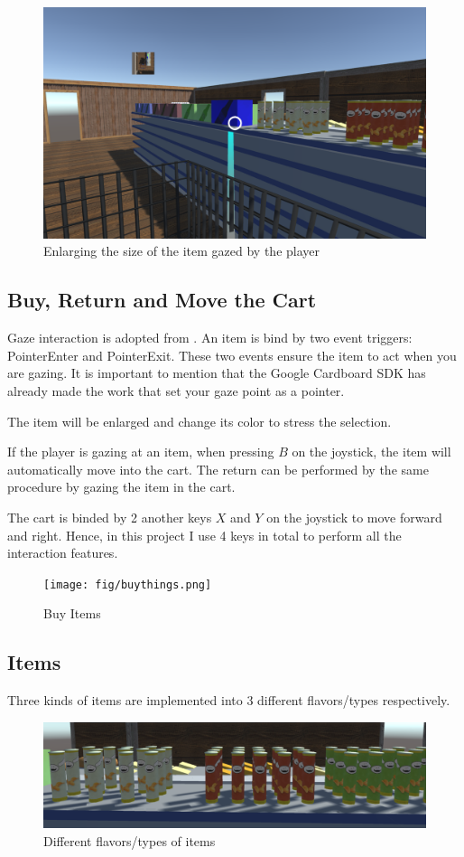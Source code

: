 \documentclass[11pt]{article}
\begin{document}
	\begin{figure}[htbp]
		\centering
		\includegraphics[width=.90\textwidth]{fig/enlargepath.png}
		\caption{Enlarging the size of the item gazed by the player}
	\end{figure}
	
	\subsection{Buy, Return and Move the Cart}
	Gaze interaction is adopted from \cite{gazeinteractiontutorial}. An item is bind by two event triggers: PointerEnter and PointerExit. These two events ensure the item to act when you are gazing. It is important to mention that the Google Cardboard SDK\cite{googlevrsdk} has already made the work that set your gaze point as a pointer. 
	
	The item will be enlarged and change its color to stress the selection.
	
	If the player is gazing at an item, when pressing $B$ on the joystick, the item will automatically move into the cart. The return can be performed by the same procedure by gazing the item in the cart.
	
	The cart is binded by 2 another keys $X$ and $Y$ on the joystick to move forward and right. Hence, in this project I use 4 keys in total to perform all the interaction features. 
	\begin{figure}[htbp]
		\centering
		\texttt{[image: fig/buythings.png]}
		\caption{Buy Items}
	\end{figure}
	
	\subsection{Items}
	Three kinds of items are implemented into 3 different flavors/types respectively.
	\begin{figure}[htbp]
		\centering
		\includegraphics[width=.90\textwidth]{fig/differentflavors.png}
		\caption{Different flavors/types of items}
	\end{figure}
	
\end{document}
